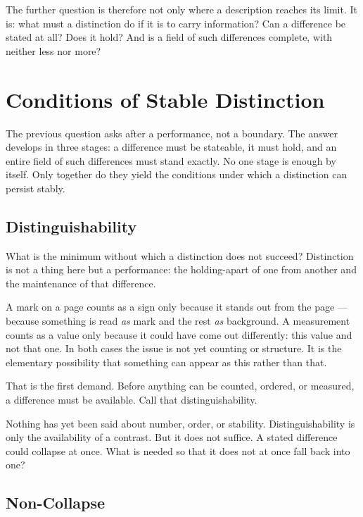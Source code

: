 \documentclass[11pt,a4paper]{book}
\begin{document}
The further question is therefore not only where a description reaches its
limit. It is: what must a distinction do if it is to carry information? Can
a difference be stated at all? Does it hold? And is a field of such
differences complete, with neither less nor more?

\chapter{Conditions of Stable Distinction}
\label{ch:distinguishability}

The previous question asks after a performance, not a boundary. The answer
develops in three stages: a difference must be stateable, it must hold, and
an entire field of such differences must stand exactly. No one stage is
enough by itself. Only together do they yield the conditions under which a
distinction can persist stably.

\section{Distinguishability}

What is the minimum without which a distinction does not succeed?
Distinction is not a thing here but a performance: the holding-apart of one
from another and the maintenance of that difference.

A mark on a page counts as a sign only because it stands out from the page
--- because something is read \emph{as} mark and the rest \emph{as}
background. A measurement counts as a value only because it could have come
out differently: this value and not that one. In both cases the issue is
not yet counting or structure. It is the elementary possibility that
something can appear as this rather than that.

That is the first demand. Before anything can be counted, ordered, or
measured, a difference must be available. Call that distinguishability.

Nothing has yet been said about number, order, or stability.
Distinguishability is only the availability of a contrast. But it does not
suffice. A stated difference could collapse at once. What is needed so that
it does not at once fall back into one?

\section{Non-Collapse}
\label{ch:reference}
\end{document}
